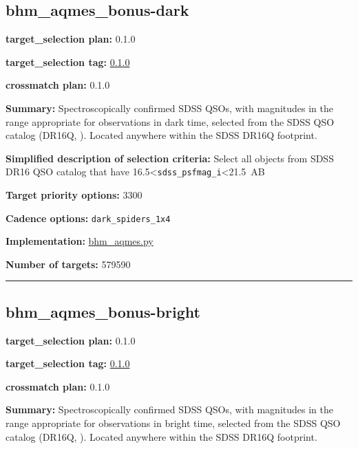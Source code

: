 \hypertarget{bhm_aqmes_bonus-dark_plan0.1.0}{%
\subsection{bhm\_aqmes\_bonus-dark}\label{bhm_aqmes_bonus-dark_plan0.1.0}}

\noindent\textbf{target\_selection plan:} 0.1.0

\noindent\textbf{target\_selection tag:}
\href{https://github.com/sdss/target_selection/tree/0.1.0/}{0.1.0}

\noindent\textbf{crossmatch plan:} 0.1.0

\noindent\textbf{Summary:} Spectroscopically confirmed SDSS QSOs, with magnitudes
in the range appropriate for observations in dark time, selected from
the SDSS QSO catalog (DR16Q,
\citealt{Lyke2020}). Located anywhere within the SDSS DR16Q footprint.

\noindent\textbf{Simplified description of selection criteria:} Select all
objects from SDSS DR16 QSO catalog that have
16.5\textless{}\texttt{sdss\_psfmag\_i}\textless21.5~AB


\noindent\textbf{Target priority options:} 3300

\noindent\textbf{Cadence options:} \texttt{dark\_spiders\_1x4}

\noindent\textbf{Implementation:}
\href{https://github.com/sdss/target_selection/blob/0.1.0/python/target_selection/cartons/bhm_aqmes.py}{bhm\_aqmes.py}

\noindent\textbf{Number of targets:} 579590

\begin{center}\rule{0.5\linewidth}{0.5pt}\end{center}

\hypertarget{bhm_aqmes_bonus-bright_plan0.1.0}{%
\subsection{bhm\_aqmes\_bonus-bright}\label{bhm_aqmes_bonus-bright_plan0.1.0}}

\noindent\textbf{target\_selection plan:} 0.1.0

\noindent\textbf{target\_selection tag:}
\href{https://github.com/sdss/target_selection/tree/0.1.0/}{0.1.0}

\noindent\textbf{crossmatch plan:} 0.1.0

\noindent\textbf{Summary:} Spectroscopically confirmed SDSS QSOs, with magnitudes
in the range appropriate for observations in bright time, selected from
the SDSS QSO catalog (DR16Q,
\citealt{Lyke2020}). Located anywhere within the SDSS DR16Q footprint.


